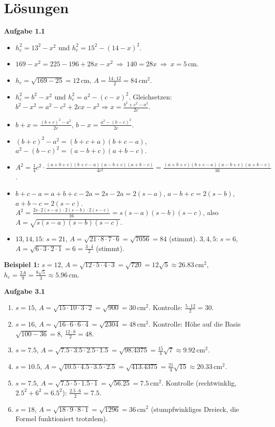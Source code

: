 \documentclass[11pt,oneside]{article}
\begin{document}
\newpage
\section*{Lösungen}
\textbf{Aufgabe 1.1}
\begin{itemize}[itemsep=0pt]
	\item[a)] $h_c^2=13^2-x^2$ und $h_c^2=15^2-(14-x)^2$.
	\item[b)] $169-x^2=225-196+28x-x^2\ \Rightarrow\ 140=28x\ \Rightarrow\ x=5$\,cm.
	\item[c)] $h_c=\sqrt{169-25}=12$\,cm, $A=\frac{14\cdot12}{2}=84$\,cm$^2$.
	\item[d)] $h_c^2=b^2-x^2$ und $h_c^2=a^2-(c-x)^2$. Gleichsetzen: $b^2-x^2=a^2-c^2+2cx-x^2\Rightarrow x=\frac{b^2+c^2-a^2}{2c}$.
	\item[e)] $b+x=\frac{(b+c)^2-a^2}{2c}$, $b-x=\frac{a^2-(b-c)^2}{2c}$.
	\item[f)] $(b+c)^2-a^2=(b+c+a)(b+c-a)$, $a^2-(b-c)^2=(a-b+c)(a+b-c)$.
	\item[g)] $A^2=\frac14c^2\cdot\frac{(a+b+c)(b+c-a)(a-b+c)(a+b-c)}{4c^2}=\frac{(a+b+c)(b+c-a)(a-b+c)(a+b-c)}{16}$.
	\item[h)] $b+c-a=a+b+c-2a=2s-2a=2(s-a)$, $a-b+c=2(s-b)$, $a+b-c=2(s-c)$. $A^2=\frac{2s\cdot2(s-a)\cdot2(s-b)\cdot2(s-c)}{16}=s(s-a)(s-b)(s-c)$, also $A=\sqrt{s(s-a)(s-b)(s-c)}$.
	\item[i)] $13,14,15$: $s=21$, $A=\sqrt{21\cdot8\cdot7\cdot6}=\sqrt{7056}=84$ (stimmt). $3,4,5$: $s=6$, $A=\sqrt{6\cdot3\cdot2\cdot1}=6=\frac{3\cdot4}{2}$ (stimmt).
\end{itemize}

\textbf{Beispiel 1:} $s=12$, $A=\sqrt{12\cdot5\cdot4\cdot3}=\sqrt{720}=12\sqrt5\approx26.83$\,cm$^2$, $h_c=\frac{2A}{9}=\frac{8\sqrt5}{3}\approx5.96$\,cm.

\textbf{Aufgabe 3.1}
\begin{enumerate}[label=\alph*), itemsep=0pt]
	\item $s=15$, $A=\sqrt{15\cdot10\cdot3\cdot2}=\sqrt{900}=30$\,cm$^2$. Kontrolle: $\frac{5\cdot12}{2}=30$.
	\item $s=16$, $A=\sqrt{16\cdot6\cdot6\cdot4}=\sqrt{2304}=48$\,cm$^2$. Kontrolle: Höhe auf die Basis $\sqrt{100-36}=8$, $\frac{12\cdot8}{2}=48$.
	\item $s=7.5$, $A=\sqrt{7.5\cdot3.5\cdot2.5\cdot1.5}=\sqrt{98.4375}=\frac{15}{4}\sqrt7\approx9.92$\,cm$^2$.
	\item $s=10.5$, $A=\sqrt{10.5\cdot4.5\cdot3.5\cdot2.5}=\sqrt{413.4375}=\frac{21}{4}\sqrt{15}\approx20.33$\,cm$^2$.
	\item $s=7.5$, $A=\sqrt{7.5\cdot5\cdot1.5\cdot1}=\sqrt{56.25}=7.5$\,cm$^2$. Kontrolle (rechtwinklig, $2.5^2+6^2=6.5^2$): $\frac{2.5\cdot6}{2}=7.5$.
	\item $s=18$, $A=\sqrt{18\cdot9\cdot8\cdot1}=\sqrt{1296}=36$\,cm$^2$ (stumpfwinkliges Dreieck, die Formel funktioniert trotzdem).
\end{enumerate}
\end{document}
